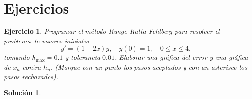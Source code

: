 \documentclass[11pt]{article}
\newtheorem{exercise}{Ejercicio}
\newtheorem*{sol}{Solución}
\begin{document}
\section{Ejercicios}

\begin{exercise}
   Programar el método Runge-Kutta Fehlberg para resolver el problema
   de valores iniciales
   \begin{equation}
     y'
     =
     (1-2x)y,
     \quad y(0)=1,
     \quad 0\leq x\leq 4
   ,\end{equation}
   tomando $h_\mathrm{max}=0.1$ y tolerancia $0.01$. Elaborar una
   gráfica del error y una gráfica de $x_n$ contra $h_n$. (Marque con
   un punto los pasos aceptados y con un asterisco los pasos
   rechazados).
\end{exercise}
\begin{sol}
\end{sol}
\end{document}
